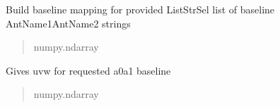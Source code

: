 \documentclass[letterpaper,10pt,english]{sphinxmanual}
\begin{document}
\begin{fulllineitems}
\begin{fulllineitems}
\begin{quote}
\begin{description}
\end{description}\end{quote}

\end{fulllineitems}


\begin{fulllineitems}
\label{\detokenize{api/killMS.Data:killMS.Data.ClassMS.ClassMS.GiveMappingAnt}}
\pysigstartsignatures
{}
\pysigstopsignatures
\sphinxAtStartPar
Build baseline mapping for provided ListStrSel list of baseline AntName1\sphinxhyphen{}AntName2 strings
\begin{quote}\begin{description}
\sphinxAtStartPar
numpy.ndarray

\end{description}\end{quote}

\end{fulllineitems}


\begin{fulllineitems}
\label{\detokenize{api/killMS.Data:killMS.Data.ClassMS.ClassMS.GiveUvwBL}}
\pysigstartsignatures
{}
\pysigstopsignatures
\sphinxAtStartPar
Gives uvw for requested a0\sphinxhyphen{}a1 baseline
\begin{quote}\begin{description}
\sphinxAtStartPar
numpy.ndarray

\end{description}\end{quote}

\end{fulllineitems}


\end{fulllineitems}
\end{document}
